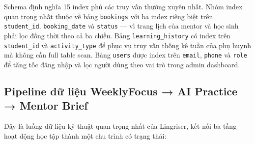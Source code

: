 Schema định nghĩa 15 index phủ các truy vấn thường xuyên nhất. Nhóm index quan trọng nhất thuộc về bảng \texttt{bookings} với ba index riêng biệt trên \texttt{student\_id}, \texttt{booking\_date} và \texttt{status} — vì trang lịch của mentor và học sinh phải lọc đồng thời theo cả ba chiều. Bảng \texttt{learning\_history} có index trên \texttt{student\_id} và \texttt{activity\_type} để phục vụ truy vấn thống kê tuần của phụ huynh mà không cần full table scan. Bảng \texttt{users} được index trên \texttt{email}, \texttt{phone} và \texttt{role} để tăng tốc đăng nhập và lọc người dùng theo vai trò trong admin dashboard.

\subsection{Pipeline dữ liệu WeeklyFocus → AI Practice → Mentor Brief}

Đây là luồng dữ liệu kỹ thuật quan trọng nhất của Lingriser, kết nối ba tầng hoạt động học tập thành một chu trình có trạng thái:

